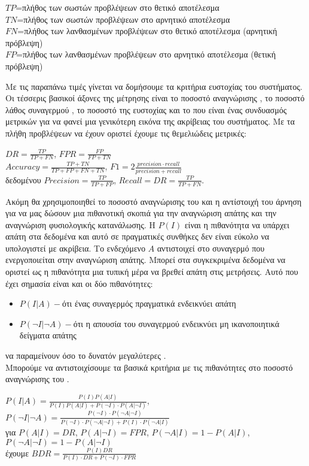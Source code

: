 \begin{center}
$TP$=πλήθος των σωστών προβλέψεων στο θετικό αποτέλεσμα\\
$TN$=πλήθος των σωστών προβλέψεων στο αρνητικό αποτέλεσμα\\
$FN$=πλήθος των λανθασμένων προβλέψεων στο θετικό αποτέλεσμα (αρνητική πρόβλεψη)\\
$FP$=πλήθος των λανθασμένων προβλέψεων στο αρνητικό αποτέλεσμα (θετική πρόβλεψη)\\
\end{center}
Με τις παραπάνω τιμές γίνεται να δομήσουμε τα κριτήρια ευστοχίας του συστήματος. Οι τέσσερις βασικοί άξονες της μέτρησης είναι το ποσοστό αναγνώρισης , το ποσοστό λάθος συναγερμού , το ποσοστό της ευστοχίας  και το  που είναι ένας συνδυασμός μετρικών για να φανεί μια γενικότερη εικόνα της ακρίβειας του συστήματος.
Με τα πλήθη προβλέψεων να έχουν οριστεί έχουμε τις θεμελιώδεις μετρικές:
\begin{center}
$DR=\frac{TP}{TP+FN}$, $FPR=\frac{FP}{FP+TN}$\\ 
$Accuracy=\frac{TP+TN}{TP+FP+FN+TN}$, $F1=2\frac{precision \cdotp recall}{precision + recall}$\\
δεδομένου $Precision=\frac{TP}{TP + FP}$, $Recall=DR=\frac{TP}{TP + FN}$.
\end{center}
Ακόμη θα χρησιμοποιηθεί το ποσοστό αναγνώρισης του  και η αντίστοιχή του άρνηση για να μας δώσουν μια πιθανοτική σκοπιά για την αναγνώριση απάτης και την αναγνώριση φυσιολογικής κατανάλωσης. Η $P(I)$ είναι η πιθανότητα να υπάρχει απάτη στα δεδομένα και αυτό σε πραγματικές συνθήκες δεν είναι εύκολο να υπολογιστεί με ακρίβεια. Το ενδεχόμενο $A$ αντιστοιχεί στο συναγερμό που ενεργοποιείται στην αναγνώριση απάτης. Μπορεί στα συγκεκριμένα δεδομένα να οριστεί ως η πιθανότητα μια τυπική μέρα να βρεθεί απάτη στις μετρήσεις. 
Αυτό που έχει σημασία είναι και οι δύο πιθανότητες:
\begin{itemize}
\item $P(I|A)-$ότι ένας συναγερμός πραγματικά ενδεικνύει απάτη
\item $P(\neg{I}|\neg{A})-$ότι η απουσία του συναγερμού ενδεικνύει μη ικανοποιητικά δείγματα απάτης
\end{itemize}
να παραμείνουν όσο το δυνατόν μεγαλύτερες \cite{propab}.\\
Μπορούμε να αντιστοιχίσουμε τα βασικά κριτήρια με τις πιθανότητες στο ποσοστό αναγνώρισης του .
\begin{center}
$P(I|A)=\frac{P(I)P(A|I)}{P(I)P(A|I)+P(\neg{I}) \cdotp P(A|\neg{I})}$, 
$P(\neg{I}|\neg{A})=\frac{P(\neg{I}) \cdotp P(\neg{A}|\neg{I})}{P(\neg{I}) \cdotp P(\neg{A}|\neg{I})+P(I) \cdotp P(\neg{A}|I)}$\\
για $P(A|I)=DR$, $P(A|\neg{I})=FPR$, $P(\neg{A}|I)=1-P(A|I)$, $P(\neg{A}|\neg{I})=1-P(A|\neg{I})$\\
έχουμε
$BDR=\frac{P(I)DR}{P(I) \cdotp DR+P(\neg{I}) \cdotp FPR}$\\

\end{center}
